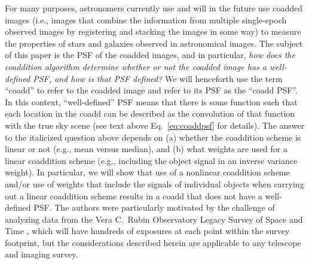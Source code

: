 \documentclass{openjournal}
\newcommand{\irresponse}[1]{{#1}}
\newcommand{\refresponse}[1]{#1}
\begin{document}
For many purposes, \irresponse{astronomers} currently use and will in \irresponse{the} future use coadded images \irresponse{(i.e., images that combine the information from multiple single-epoch observed images by registering and stacking the images in some way)} to measure the properties of stars and galaxies observed in astronomical images.  The subject of this paper is the PSF of the coadded images, and in particular, {\em \irresponse{how does the coaddition algorithm determine whether or not the coadded image has a well-defined PSF, and how is that PSF defined?}}  We will henceforth use the term ``coadd'' to refer to the coadded image and refer to its PSF as the ``coadd PSF''.  \refresponse{In this context, ``well-defined'' PSF means that there is some function such that each location in the coadd can be described as the convolution of that function with the true sky scene (see text above Eq.~\ref{eq:coaddpsf} for details). } The answer to \refresponse{the italicized } question \refresponse{above} depends on (a) whether the coaddition scheme is linear or not (e.g., mean versus median), and (b) what weights are used for a linear coaddition scheme (e.g., including the object signal in an inverse variance weight). In particular, we will show that use of a nonlinear coaddition scheme and/or use of weights that include the signals of individual objects when carrying out a linear coaddition scheme results in a coadd that does not have a well-defined PSF. \irresponse{The authors were particularly motivated by the challenge of analyzing data from the Vera C.\ Rubin Observatory Legacy Survey of Space and Time \citep[LSST;][]{2009arXiv0912.0201L,2019ApJ...873..111I}, which will have hundreds of exposures at each point within the survey footprint, but the considerations described herein are applicable to any telescope and imaging survey.}
\end{document}
